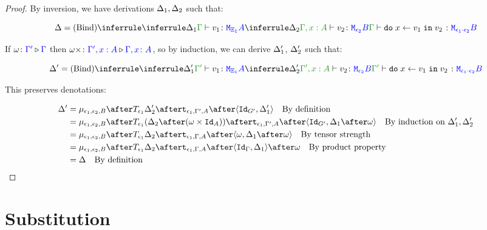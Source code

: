 \documentclass{report}
\begin{document}
\begin{framed}
\begin{proof}
        
        By inversion, we have derivations $\Delta_1, \Delta_2$ such that:
        
        
        \begin{equation}
            \D = \ntreeruleII{Bind}{
                \treeruleI{\D_1}{\typerelation{\G}{v_1}{\M{\E_1}{A}}}
                }{
                \treeruleI{\D_2}{\typerelation{\G,x: A}{v_2}{\M{\e_2}{B}}}
            }{
                \typerelation{\G}{\doin{x}{v_1}{v_2}}{\M{\e_1\dot\e_2}{B}}
            }
        \end{equation}
        
        If $\omega \colon {\color{blue}\Gamma'} \triangleright {\color {blue} \Gamma}$ then $\omega\times \colon {\color{blue}\Gamma',x:A} \triangleright {\color {blue} \Gamma, x\colon A}$, so by induction, we can derive $\Delta_1'$, $\Delta_2'$ such that:
        
        \begin{equation}
            \D' = \ntreeruleII{Bind}{
                \treeruleI{\D_1'}{\typerelation{\G'}{v_1}{\M{\E_1}{A}}}
                }{
                \treeruleI{\D_2'}{\typerelation{\G',x: A}{v_2}{\M{\e_2}{B}}}
            }{
                \typerelation{\G'}{\doin{x}{v_1}{v_2}}{\M{\e_1\dot\e_2}{B}}
            }
        \end{equation}
        
        This preserves denotations:
        
        \begin{align*}
            \D' & = \bind{\e_1}{\e_2}{B}\after\T{\e_1}{\D_2'}\after\tstrength{\e_1}{\G'}{A}\after\pr{\Id{G'}}{\D_1'}\qt{By definition}\\
            & = \bind{\e_1}{\e_2}{B}\after\T{\e_1}{(\D_2\after(\w\times\Id{A}))}\after\tstrength{\e_1}{\G'}{A}\after\pr{\Id{G'}}{\D_1\after\w}\qt{By induction on $\D_1', \D_2'$}\\
            & = \bind{\e_1}{\e_2}{B}\after\T{\e_1}{\D_2}\after\tstrength{\e_1}{\G}{A}\after\pr{\w}{\D_1\after\w}\qt{By tensor strength}\\
            & = \bind{\e_1}{\e_2}{B}\after\T{\e_1}{\D_2}\after\tstrength{\e_1}{\G}{A}\after\pr{\idg}{\D_1}\after\w\qt{By product property}\\
            & = \D \qt{By definition}
        \end{align*}
        
    \end{proof}
\end{framed}


\chapter{Substitution}
\end{document}
